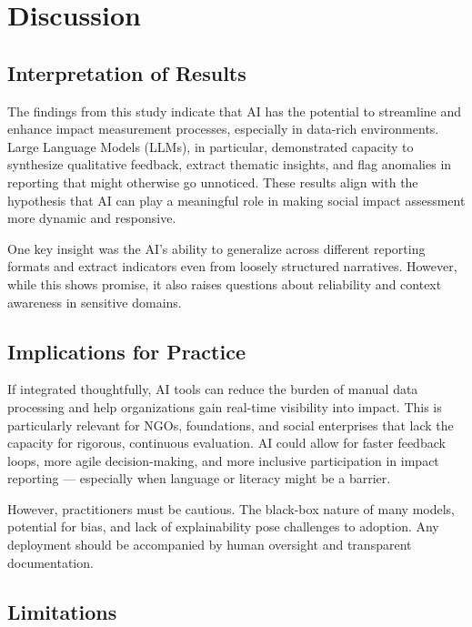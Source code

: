 

\chapter{Discussion}\label{ch:discussion}


\section{Interpretation of Results}\label{sec:interpretation-of-results}

The findings from this study indicate that AI has the potential to streamline and enhance impact measurement processes, especially in data-rich environments.
Large Language Models (LLMs), in particular, demonstrated capacity to synthesize qualitative feedback, extract thematic insights, and flag anomalies in reporting that might otherwise go unnoticed.
These results align with the hypothesis that AI can play a meaningful role in making social impact assessment more dynamic and responsive.

One key insight was the AI's ability to generalize across different reporting formats and extract indicators even from loosely structured narratives.
However, while this shows promise, it also raises questions about reliability and context awareness in sensitive domains.

\section{Implications for Practice}\label{sec:implications-for-practice}

If integrated thoughtfully, AI tools can reduce the burden of manual data processing and help organizations gain real-time visibility into impact.
This is particularly relevant for NGOs, foundations, and social enterprises that lack the capacity for rigorous, continuous evaluation.
AI could allow for faster feedback loops, more agile decision-making, and more inclusive participation in impact reporting — especially when language or literacy might be a barrier.

However, practitioners must be cautious.
The black-box nature of many models, potential for bias, and lack of explainability pose challenges to adoption.
Any deployment should be accompanied by human oversight and transparent documentation.

\section{Limitations}\label{sec:limitations}

